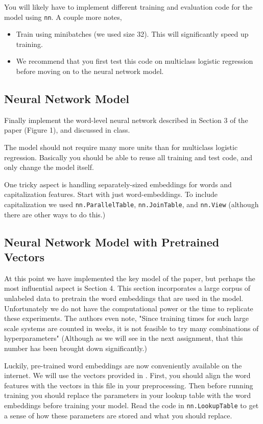\documentclass[11pt]{article}
\begin{document}
 You will likely have to implement
 different training and evaluation
 code for the model using
 \texttt{nn}. A couple more notes,
 
 \begin{itemize}
 \item Train using minibatches (we used size 32). This will significantly speed up training. 

 \item We recommend that you first
   test this code on multiclass
   logistic regression before moving
   on to the neural network
   model. 
 \end{itemize}

\subsection{Neural Network Model}

Finally implement the word-level
neural network described in Section
3 of the paper (Figure 1), and
discussed in class. 

The model should not require many
more units than for multiclass
logistic regression. Basically you
should be able to reuse all training
and test code, and only change the
model itself.

One tricky aspect is handling
separately-sized embeddings for
words and capitalization
features. Start with just
word-embeddings.  To include
capitalization we used
\texttt{nn.ParallelTable},
\texttt{nn.JoinTable}, and
\texttt{nn.View} (although there are
other ways to do this.)



\subsection{Neural Network Model with Pretrained Vectors}

At this point we have implemented the key model of the paper, but
perhaps the most influential aspect is Section 4. This section
incorporates a large corpus of unlabeled data to pretrain the word
embeddings that are used in the model. Unfortunately we do not have
the computational power or the time to replicate these
experiments. The authors even note, "Since training times for such
large scale systems are counted in weeks, it is not feasible to try
many combinations of hyperparameters" (Although as we will see in the
next assignment, that this number has been brought down
significantly.)
 
Luckily, pre-trained word embeddings are now conveniently available on
the internet. We will use the vectors provided in \texttt{}. First,
you should align the word features with the vectors in this file in
your preprocessing. Then before running training you should replace
the parameters in your lookup table with the word embeddings before
training your model. Read the code in \texttt{nn.LookupTable} to get a
sense of how these parameters are stored and what you should replace.
\end{document}
